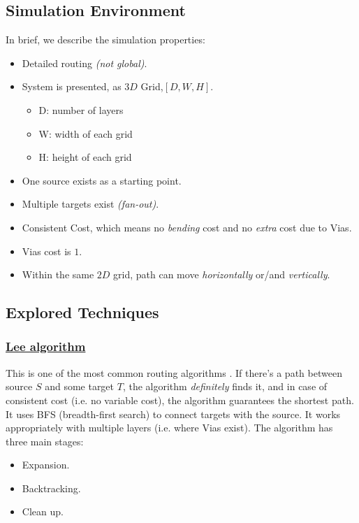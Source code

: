 \subsection{Simulation Environment}
    In brief, we describe the simulation properties:
    \begin{itemize}
        \item Detailed routing \emph{(not global)}.
        \item System is presented, as $3D$ Grid,$[D, W, H]$.
        \begin{itemize}
            \item D: number of layers 
            \item W: width of each grid
            \item H: height of each grid
        \end{itemize}
        \item One source exists as a starting point.
        \item Multiple targets exist \emph{(fan-out)}.          
        \item Consistent Cost, which means no \emph{bending} cost and no \emph{extra} cost due to Vias.
        \item Vias cost is $1$.
        \item Within the same $2D$ grid, path can move \emph{horizontally} or/and \emph{vertically}.
    \end{itemize}

\subsection{Explored Techniques}
    \subsubsection{\underline{Lee algorithm}}
    \label{LeeSection}
    This is one of the most common routing algorithms \cite{LeeRef}.
    If there's a path between source $S$ and some target $T$, the algorithm \emph{definitely} finds it,
    and in case of consistent cost (i.e. no variable cost), the algorithm guarantees the shortest path.
    It uses BFS (breadth-first search) to connect targets with the source.
    It works appropriately with multiple layers (i.e. where Vias exist).
    The algorithm has three main stages:
    \begin{itemize}
        \item Expansion.
        \item Backtracking.
        \item Clean up.
    \end{itemize}

